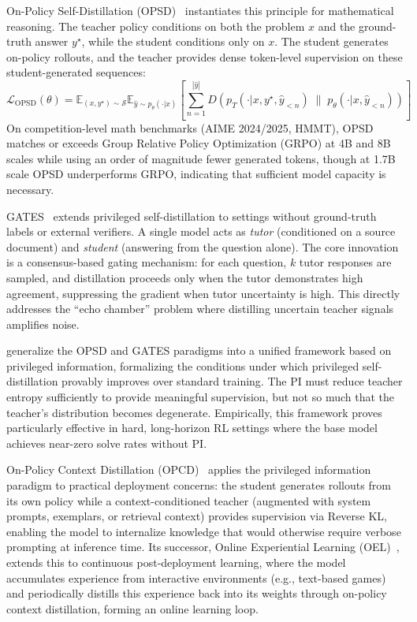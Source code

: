 \documentclass{article} %
\newcommand{\ptheta}{p_\theta}
\newcommand{\pteacher}{p_T}
\begin{document}
On-Policy Self-Distillation (OPSD)~\citep{2601.18734} instantiates this principle for mathematical reasoning. The teacher policy conditions on both the problem $x$ and the ground-truth answer $y^\star$, while the student conditions only on $x$. The student generates on-policy rollouts, and the teacher provides dense token-level supervision on these student-generated sequences:
\begin{equation}
    \mathcal{L}_{\text{OPSD}}(\theta) = \mathbb{E}_{(x, y^\star) \sim \mathcal{S}} \mathbb{E}_{\hat{y} \sim \ptheta(\cdot|x)} \left[ \sum_{n=1}^{|\hat{y}|} D\!\left( \pteacher(\cdot|x, y^\star, \hat{y}_{<n}) \;\|\; \ptheta(\cdot|x, \hat{y}_{<n}) \right) \right]
\end{equation}
On competition-level math benchmarks (AIME 2024/2025, HMMT), OPSD matches or exceeds Group Relative Policy Optimization (GRPO) at 4B and 8B scales while using an order of magnitude fewer generated tokens, though at 1.7B scale OPSD underperforms GRPO, indicating that sufficient model capacity is necessary.

GATES~\citep{2602.20574} extends privileged self-distillation to settings without ground-truth labels or external verifiers. A single model acts as \emph{tutor} (conditioned on a source document) and \emph{student} (answering from the question alone). The core innovation is a consensus-based gating mechanism: for each question, $k$ tutor responses are sampled, and distillation proceeds only when the tutor demonstrates high agreement, suppressing the gradient when tutor uncertainty is high. This directly addresses the ``echo chamber'' problem where distilling uncertain teacher signals amplifies noise.

\citet{2602.04942} generalize the OPSD and GATES paradigms into a unified framework based on privileged information, formalizing the conditions under which privileged self-distillation provably improves over standard training. The PI must reduce teacher entropy sufficiently to provide meaningful supervision, but not so much that the teacher's distribution becomes degenerate. Empirically, this framework proves particularly effective in hard, long-horizon RL settings where the base model achieves near-zero solve rates without PI.

On-Policy Context Distillation (OPCD)~\citep{2602.12275} applies the privileged information paradigm to practical deployment concerns: the student generates rollouts from its own policy while a context-conditioned teacher (augmented with system prompts, exemplars, or retrieval context) provides supervision via Reverse KL, enabling the model to internalize knowledge that would otherwise require verbose prompting at inference time. Its successor, Online Experiential Learning (OEL)~\citep{2603.16856}, extends this to continuous post-deployment learning, where the model accumulates experience from interactive environments (e.g., text-based games) and periodically distills this experience back into its weights through on-policy context distillation, forming an online learning loop.
\end{document}
